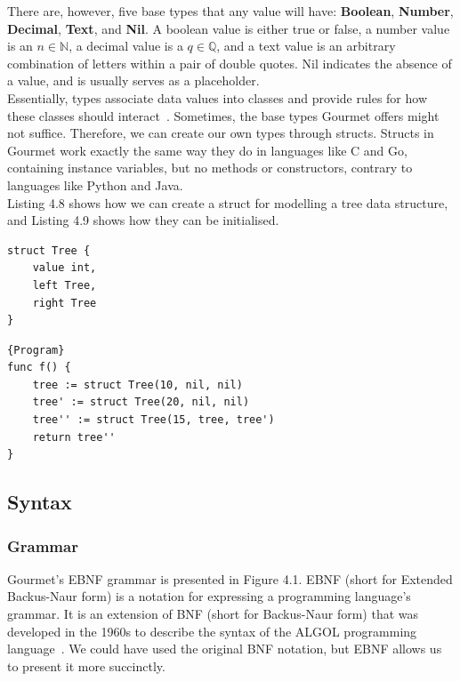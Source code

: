 There are, however, five base types that any value will have: \textbf{Boolean}, \textbf{Number}, \textbf{Decimal}, \textbf{Text}, and \textbf{Nil}. A boolean value is either true or false, a number value is an  $n \in \mathbb{N}$, a decimal value is a $q \in \mathbb{Q}$, and a text value is an arbitrary combination of letters within a pair of double quotes. Nil indicates the absence of a value, and is usually serves as a placeholder. \hfill \\

Essentially, types associate data values into classes and provide rules for how these classes should interact~\cite{pierce2002types, LYAH}. Sometimes, the base types Gourmet offers might not suffice. Therefore, we can create our own types through structs. Structs in Gourmet work exactly the same way they do in languages like C and Go, containing instance variables, but no methods or constructors, contrary to languages like Python and Java. \hfill \\

Listing 4.8 shows how we can create a struct for modelling a tree data structure, and Listing 4.9 shows how they can be initialised. \hfill \\

\begin{lstlisting}[caption={A Gourmet struct Tree, with instance variables value, left and right}, captionpos=b]
struct Tree {
    value int,
    left Tree,
    right Tree
}
\end{lstlisting}

\begin{lstlisting}[caption=A function to initialise three tree structs and return the last one,captionpos=b]{Program}
func f() {
    tree := struct Tree(10, nil, nil)
    tree' := struct Tree(20, nil, nil)
    tree'' := struct Tree(15, tree, tree')
    return tree''
}
\end{lstlisting}

\subsection{Syntax}

\subsubsection{Grammar}

Gourmet's EBNF grammar is presented in Figure 4.1. EBNF (short for Extended Backus-Naur form) is a notation for expressing a programming language's grammar. It is an extension of BNF (short for Backus-Naur form) that was developed in the 1960s to describe the syntax of the ALGOL programming language~\cite{feynman2016ebnf}. We could have used the original BNF notation, but EBNF allows us to present it more succinctly. \hfill \\

